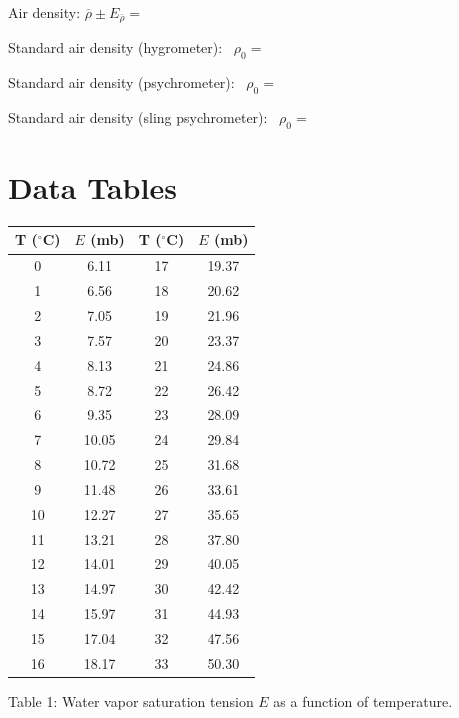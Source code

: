 \documentclass{article}
\begin{document}
Air density: $\overline{\rho} \pm E_{\bar \rho} = $ \underline{\hspace{4cm}}
 
\vspace{5mm}
Standard air density (hygrometer): ~$\rho_0 =$
\underline{\hspace{4cm}}
\vspace{5mm}

Standard air density (psychrometer): ~$\rho_0 =$
\underline{\hspace{4cm}}

\vspace{5mm}

Standard air density (sling psychrometer): ~$\rho_0 =$
\underline{\hspace{4cm}}

\nocite{*}
\newpage
\appendix
\section{Data Tables}


\begin{center}
\begin{tabular}{|c|c||c|c|} \hline
T ($^{\circ}$C)  &  $E$ (mb)  & T ($^{\circ}$C)  & $E$ (mb)  \\
\hline
0  &  6.11  &  17  &  19.37  \\
\hline
1  &  6.56  &  18  &  20.62  \\
\hline
2  &  7.05  &  19  &  21.96  \\
\hline
3  &  7.57  &  20  &  23.37  \\
\hline
4  &  8.13  &  21  &  24.86  \\
\hline
5  &  8.72  &  22  &  26.42  \\
\hline
6  &  9.35  &  23  &  28.09  \\
\hline
7  &  10.05  &  24  &  29.84  \\
\hline
8  &  10.72  &  25  &  31.68  \\
\hline
9  &  11.48  &  26  &  33.61  \\
\hline
10  &  12.27  &  27  &  35.65  \\
\hline
11  &  13.21  &  28  &  37.80  \\
\hline
12  &  14.01  &  29  &  40.05  \\
\hline
13  &  14.97  &  30  &  42.42  \\
\hline
14  &  15.97  &  31  &  44.93  \\
\hline
15  &  17.04  &  32  &  47.56  \\
\hline
16  &  18.17  &  33  &  50.30  \\
\hline
\end{tabular}

Table 1: Water vapor saturation tension $E$ as a function of temperature.
\end{center}
\end{document}

